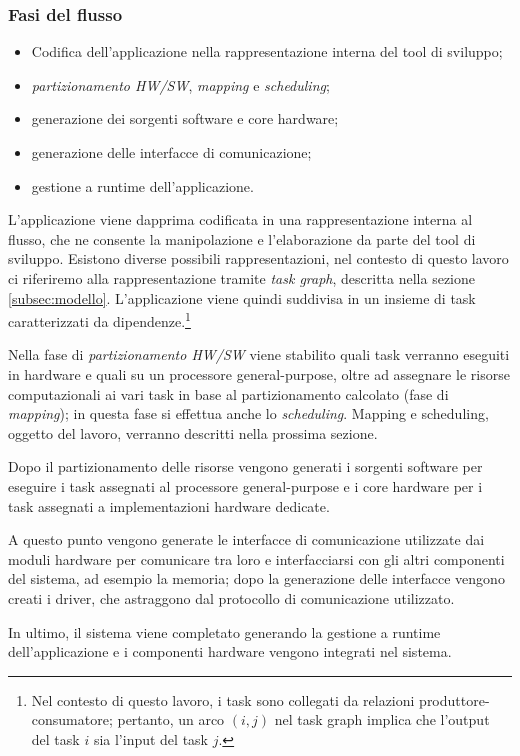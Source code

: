 \subsubsection{Fasi del flusso}
\begin{itemize}
  \item Codifica dell'applicazione nella rappresentazione interna del tool di sviluppo;
  \item \emph{partizionamento HW/SW}, \emph{mapping} e \emph{scheduling};
  \item generazione dei sorgenti software e core hardware;
  \item generazione delle interfacce di comunicazione;
  \item gestione a runtime dell'applicazione.
\end{itemize}
L'applicazione viene dapprima codificata in una
rappresentazione interna al flusso, che ne consente la manipolazione e
l'elaborazione da parte del tool di sviluppo. Esistono diverse possibili
rappresentazioni, nel contesto di questo lavoro ci riferiremo alla
rappresentazione tramite \emph{task graph}, descritta nella sezione
\ref{subsec:modello}. L'applicazione viene quindi suddivisa in un
insieme di task caratterizzati da dipendenze.\footnote{Nel contesto di questo
lavoro, i task sono collegati da relazioni produttore-consumatore; pertanto, un arco $(i,j)$ nel task graph implica che
l'output del task $i$ sia l'input del task $j$.}

Nella fase di \emph{partizionamento HW/SW} viene stabilito quali task verranno
eseguiti in hardware e quali su un processore general-purpose, oltre ad assegnare le risorse computazionali ai vari task in
base al partizionamento calcolato (fase di
\emph{mapping}); in questa fase si effettua anche lo
\emph{scheduling}.  Mapping e scheduling, oggetto del lavoro, verranno
descritti nella prossima sezione.

Dopo il partizionamento delle risorse vengono generati i sorgenti software per
eseguire i task assegnati al processore general-purpose e i core hardware per i
task assegnati a implementazioni hardware dedicate.

A questo punto vengono generate le interfacce di comunicazione utilizzate dai
moduli hardware per comunicare tra loro e interfacciarsi con gli altri
componenti del sistema, ad esempio la memoria; dopo la generazione delle
interfacce vengono creati i driver, che astraggono dal protocollo di
comunicazione utilizzato.

In ultimo, il sistema viene completato generando la gestione a runtime dell'applicazione e i componenti
hardware vengono integrati nel sistema.

